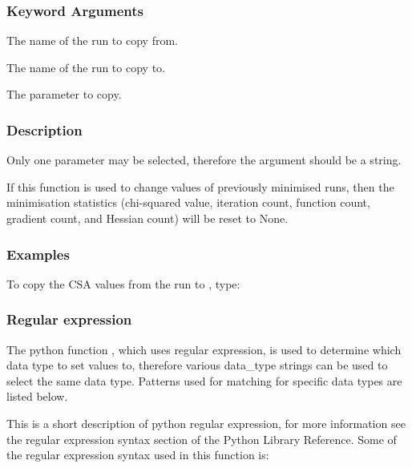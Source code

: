   
 \subsubsection{Keyword Arguments} 

   The name of the run to copy from.   

   The name of the run to copy to.   

   The parameter to copy.  

  

  
 \subsubsection{Description} 

 Only one parameter may be selected, therefore the  argument should be a string. 
  

 If this function is used to change values of previously minimised runs, then the minimisation statistics (chi-squared value, iteration count, function count, gradient count, and Hessian count) will be reset to None. 
  

  
 \subsubsection{Examples} 

 To copy the CSA values from the run  to , type: 
  


  
 \subsubsection{Regular expression} 

 The python function , which uses regular expression, is used to determine which data type to set values to, therefore various data\_type strings can be used to select the same data type.  Patterns used for matching for specific data types are listed below. 
  

 This is a short description of python regular expression, for more information see the regular expression syntax section of the Python Library Reference.  Some of the regular expression syntax used in this function is: 
  

